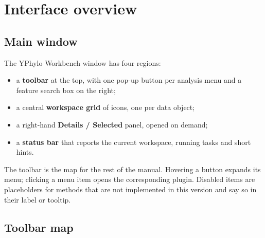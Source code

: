 \documentclass[10pt]{report}
\begin{document}
\chapter{Interface overview}

\section{Main window}

The YPhylo Workbench window has four regions:

\begin{itemize}
  \item a \textbf{toolbar} at the top, with one pop-up button per analysis
        menu and a feature search box on the right;
  \item a central \textbf{workspace grid} of icons, one per data object;
  \item a right-hand \textbf{Details / Selected} panel, opened on demand;
  \item a \textbf{status bar} that reports the current workspace, running
        tasks and short hints.
\end{itemize}

The toolbar is the map for the rest of the manual. Hovering a button expands
its menu; clicking a menu item opens the corresponding plugin. Disabled items
are placeholders for methods that are not implemented in this version and say
so in their label or tooltip.

\section{Toolbar map}
\end{document}
